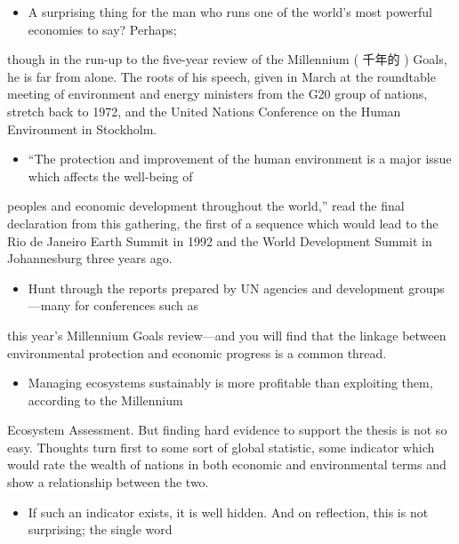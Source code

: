 \documentclass[UTF8,11pt]{ctexart}
\begin{document}
\begin{itemize}[leftmargin=2em,itemsep=.2em,topsep=.4em]\item[B.] A surprising thing for the man who runs one of the world’s most powerful economies to say? Perhaps;
\end{itemize}

though in the run-up to the five-year review of the Millennium ( 千年的 ) Goals, he is far from alone. The roots of his speech, given in March at the roundtable meeting of environment and energy ministers from the G20 group of nations, stretch back to 1972, and the United Nations Conference on the Human Environment in Stockholm.


\begin{itemize}[leftmargin=2em,itemsep=.2em,topsep=.4em]\item[C.] “The protection and improvement of the human environment is a major issue which affects the well-being of
\end{itemize}

peoples and economic development throughout the world,” read the final declaration from this gathering, the first of a sequence which would lead to the Rio de Janeiro Earth Summit in 1992 and the World Development Summit in Johannesburg three years ago.


\begin{itemize}[leftmargin=2em,itemsep=.2em,topsep=.4em]\item[D.] Hunt through the reports prepared by UN agencies and development groups—many for conferences such as
\end{itemize}

this year’s Millennium Goals review—and you will find that the linkage between environmental protection and economic progress is a common thread.


\begin{itemize}[leftmargin=2em,itemsep=.2em,topsep=.4em]\item[E.] Managing ecosystems sustainably is more profitable than exploiting them, according to the Millennium
\end{itemize}

Ecosystem Assessment. But finding hard evidence to support the thesis is not so easy. Thoughts turn first to some sort of global statistic, some indicator which would rate the wealth of nations in both economic and environmental terms and show a relationship between the two.


\begin{itemize}[leftmargin=2em,itemsep=.2em,topsep=.4em]\item[F.] If such an indicator exists, it is well hidden. And on reflection, this is not surprising; the single word
\end{itemize}
\end{document}
